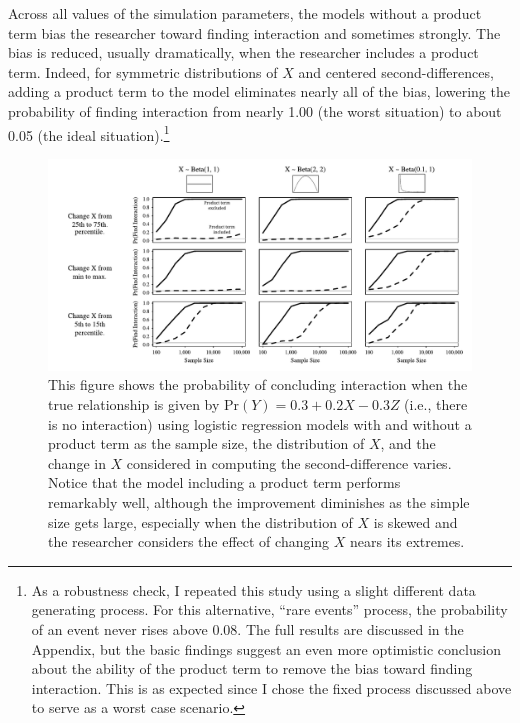 \documentclass[12pt]{article}
\begin{document}
Across all values of the simulation parameters, the models without a product term bias the researcher toward finding interaction and sometimes strongly. The bias is reduced, usually dramatically, when the researcher includes a product term. Indeed, for symmetric distributions of $X$ and centered second-differences, adding a product term to the model eliminates nearly all of the bias, lowering the probability of finding interaction
from nearly 1.00 (the worst  situation) to about 0.05 (the ideal situation).\footnote{As a robustness check, I repeated this study using a slight different data generating process. For this alternative, ``rare events'' process, the probability of an event never rises above 0.08. The full results are discussed in the Appendix, but the basic findings suggest an even more optimistic conclusion about the ability of the product term to remove the bias toward finding interaction. This is as expected since I chose the fixed process discussed above to serve as a worst case scenario.}

\begin{figure}
\begin{center}
\includegraphics[width=\linewidth]{fig/fig_sm.pdf}
\end{center}
\caption{This figure shows the probability of concluding interaction when the true relationship is given by $\text{Pr}(Y) = 0.3 + 0.2X - 0.3Z$ (i.e., there is no interaction) using logistic regression models with and without a product term as the sample size, the distribution of $X$, and the change in $X$ considered in computing the second-difference varies. Notice that the model including a product term performs remarkably well, although the improvement diminishes as the simple size gets large, especially when the distribution of $X$ is skewed and the researcher considers the effect of changing $X$ nears its extremes.}\label{fig:sm}
\end{figure}
\end{document}

